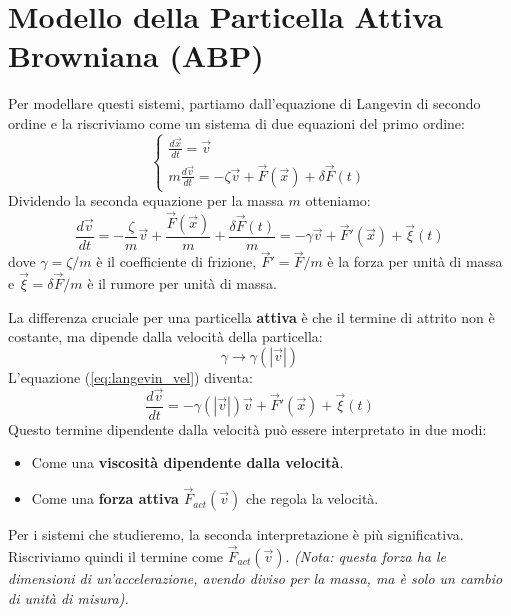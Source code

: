 \section{Modello della Particella Attiva Browniana (ABP)}
Per modellare questi sistemi, partiamo dall'equazione di Langevin di secondo ordine e la riscriviamo come un sistema di due equazioni del primo ordine:
\begin{equation}
    \begin{cases}
        \frac{d\vec{x}}{dt} = \vec{v} \\
        m\frac{d\vec{v}}{dt} = -\zeta\vec{v} + \vec{F}(\vec{x}) + \delta\vec{F}(t)
    \end{cases}
\end{equation}
Dividendo la seconda equazione per la massa $m$ otteniamo:
\begin{equation}
    \frac{d\vec{v}}{dt} = -\frac{\zeta}{m}\vec{v} + \frac{\vec{F}(\vec{x})}{m} + \frac{\delta\vec{F}(t)}{m} = -\gamma\vec{v} + \vec{F}'(\vec{x}) + \vec{\xi}(t) \label{eq:langevin_vel}
\end{equation}
dove $\gamma = \zeta/m$ è il coefficiente di frizione, $\vec{F}' = \vec{F}/m$ è la forza per unità di massa e $\vec{\xi} = \delta\vec{F}/m$ è il rumore per unità di massa.

La differenza cruciale per una particella \textbf{attiva} è che il termine di attrito non è costante, ma dipende dalla velocità della particella:
\begin{equation}
    \gamma \rightarrow \gamma(|\vec{v}|)
\end{equation}
L'equazione (\ref{eq:langevin_vel}) diventa:
\begin{equation}
    \frac{d\vec{v}}{dt} = -\gamma(|\vec{v}|)\vec{v} + \vec{F}'(\vec{x}) + \vec{\xi}(t)
\end{equation}
Questo termine dipendente dalla velocità può essere interpretato in due modi:
\begin{itemize}
    \item Come una \textbf{viscosità dipendente dalla velocità}.
    \item Come una \textbf{forza attiva} $\vec{F}_{act}(\vec{v})$ che regola la velocità.
\end{itemize}
Per i sistemi che studieremo, la seconda interpretazione è più significativa. Riscriviamo quindi il termine come $\vec{F}_{act}(\vec{v})$. \textit{(Nota: questa forza ha le dimensioni di un'accelerazione, avendo diviso per la massa, ma è solo un cambio di unità di misura).}

